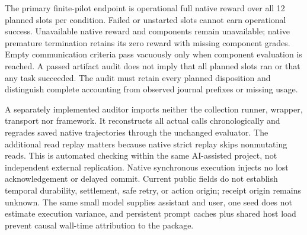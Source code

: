 The primary finite-pilot endpoint is operational full native reward over all 12 planned slots per condition. Failed or unstarted slots cannot earn operational success. Unavailable native reward and components remain unavailable; native premature termination retains its zero reward with missing component grades. Empty communication criteria pass vacuously only when component evaluation is reached. A passed artifact audit does not imply that all planned slots ran or that any task succeeded. The audit must retain every planned disposition and distinguish complete accounting from observed journal prefixes or missing usage.

A separately implemented auditor imports neither the collection runner, wrapper, transport nor framework. It reconstructs all actual calls chronologically and regrades saved native trajectories through the unchanged evaluator. The additional read replay matters because native strict replay skips nonmutating reads. This is automated checking within the same AI-assisted project, not independent external replication. Native synchronous execution injects no lost acknowledgement or delayed commit. Current public fields do not establish temporal durability, settlement, safe retry, or action origin; receipt origin remains unknown. The same small model supplies assistant and user, one seed does not estimate execution variance, and persistent prompt caches plus shared host load prevent causal wall-time attribution to the package.
